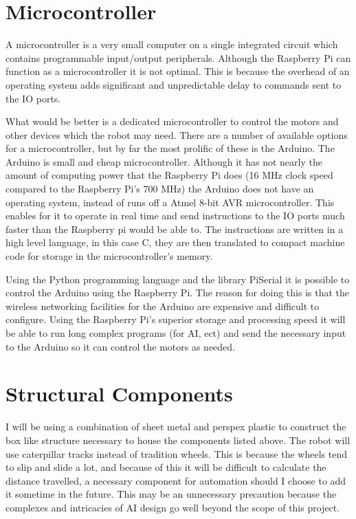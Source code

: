 \documentclass[]{report}   %
\begin{document}
			\section{Microcontroller}
				A microcontroller is a very small computer on a single integrated circuit which contains programmable input/output peripherals.
				Although the Raspberry Pi can function as a microcontroller it is not optimal. This is because the overhead of an operating system
				adds significant and unpredictable delay to commands sent to the IO ports.
				
				What would be better is a dedicated microcontroller to control the motors and other devices which the robot may need. There are a number
				of available options for a microcontroller, but by far the most prolific of these is the Arduino. The Arduino is small and cheap
				microcontroller. Although it has not nearly the amount of computing power that the Raspberry Pi does (16 MHz clock speed compared to
				the Raspberry Pi's 700 MHz\cite{raspclock}) the Arduino does not have an operating system, instead of runs off a
				Atmel 8-bit AVR microcontroller. This enables for it to operate in real time and send instructions to the IO ports much faster than the
				Raspberry pi would be able to. The instructions are written in a high level language, in this case C, they are then translated to
				compact machine code for storage in the microcontroller's memory.
				
				Using the Python programming language and the library PiSerial it is possible to control the Arduino using the Raspberry Pi. The reason
				for doing this is that the wireless networking facilities for the Arduino are expensive and difficult to configure. Using the Raspberry
				Pi's superior storage and processing speed it will be able to run long complex programs (for AI, ect) and send the necessary input to
				the Arduino so it can control the motors as needed.
			
			\section{Structural Components}
				I will be using a combination of sheet metal and perspex plastic to construct the box like structure necessary to house the components
				listed above. The robot will use caterpillar tracks instead of tradition wheels. This is because the wheels tend to slip and slide a lot,
				and because of this it will be difficult to calculate the distance travelled, a necessary component for automation should I choose to add
				it sometime in the future. This may be an unnecessary precaution because the complexes and intricacies of AI design go well beyond the
				scope of this project.
				
\end{document}
